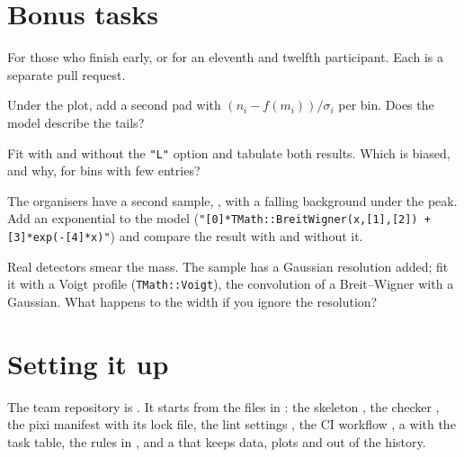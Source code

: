\section{Bonus tasks}
\label{sec:bonus}

For those who finish early, or for an eleventh and twelfth participant. Each
is a separate pull request.

\begin{description}[style=nextline]
\item[B1: pulls] Under the plot, add a second pad with
  $(n_i - f(m_i))/\sigma_i$ per bin. Does the model describe the tails?
\item[B2: chi-square versus likelihood] Fit with and without the \texttt{"L"}
  option and tabulate both results. Which is biased, and why, for bins with
  few entries?
\item[B3: a background] The organisers have a second sample,
  , with a falling background under the peak. Add an
  exponential to the model (\texttt{"[0]*TMath::BreitWigner(x,[1],[2]) +
  [3]*exp(-[4]*x)"}) and compare the result with and without it.
\item[B4: detector resolution] Real detectors smear the mass. The sample
   has a Gaussian resolution added; fit it with a
  Voigt profile (\texttt{TMath::Voigt}), the convolution of a Breit--Wigner
  with a Gaussian. What happens to the width if you ignore the resolution?
\end{description}

\section{Setting it up}
\label{sec:teamsetup}

The team repository is
\href{https://github.com/matclim/sw_tutorial_2026}{}.
It starts from the
files in : the skeleton
, the checker , the pixi
manifest  with its lock file, the lint settings
, the CI workflow , a
 with the task table, the rules in , and
a  that keeps data, plots and  out of the
history.

\iforganiser\fi
